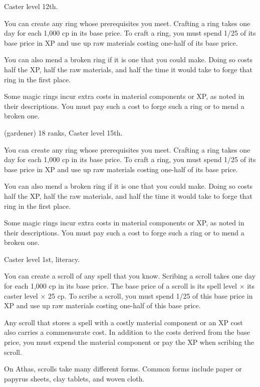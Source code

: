 {Caster level 12th.}
{You can create any ring whose prerequisites you meet. Crafting a ring takes one day for each 1,000 cp in its base price. To craft a ring, you must spend 1/25 of its base price in XP and use up raw materials costing one-half of its base price.

You can also mend a broken ring if it is one that you could make. Doing so costs half the XP, half the raw materials, and half the time it would take to forge that ring in the first place.

Some magic rings incur extra costs in material components or XP, as noted in their descriptions. You must pay such a cost to forge such a ring or to mend a broken one.}

{ (gardener) 18 ranks, Caster level 15th.}
{You can create any ring whose prerequisites you meet. Crafting a ring takes one day for each 1,000 cp in its base price. To craft a ring, you must spend 1/25 of its base price in XP and use up raw materials costing one-half of its base price.

You can also mend a broken ring if it is one that you could make. Doing so costs half the XP, half the raw materials, and half the time it would take to forge that ring in the first place.

Some magic rings incur extra costs in material components or XP, as noted in their descriptions. You must pay such a cost to forge such a ring or to mend a broken one.}



{}
{Caster level 1st, literacy.}
{You can create a scroll of any spell that you know. Scribing a scroll takes one day for each 1,000 cp in its base price. The base price of a scroll is its spell level $\times$ its caster level $\times$ 25 cp. To scribe a scroll, you must spend 1/25 of this base price in XP and use up raw materials costing one-half of this base price.

Any scroll that stores a spell with a costly material component or an XP cost also carries a commensurate cost. In addition to the costs derived from the base price, you must expend the material component or pay the XP when scribing the scroll.}
{}
{On Athas, scrolls take many different forms. Common forms include paper or papyrus sheets, clay tablets, and woven cloth.}

